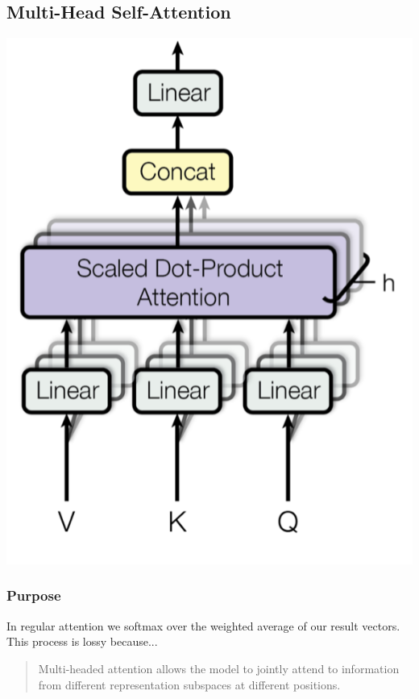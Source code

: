\documentclass{article}
\begin{document}
    \subsection{Multi-Head Self-Attention}

    \begin{center}
        \includegraphics[scale=0.2]{fig6.png}
    \end{center}

    \subsubsection{Purpose}

    In regular attention we softmax over the weighted average of our result vectors. This process is lossy because...

    \begin{quote}
        Multi-headed attention allows the model to jointly attend to information from different representation subspaces at different positions.
    \end{quote} 
\end{document}
